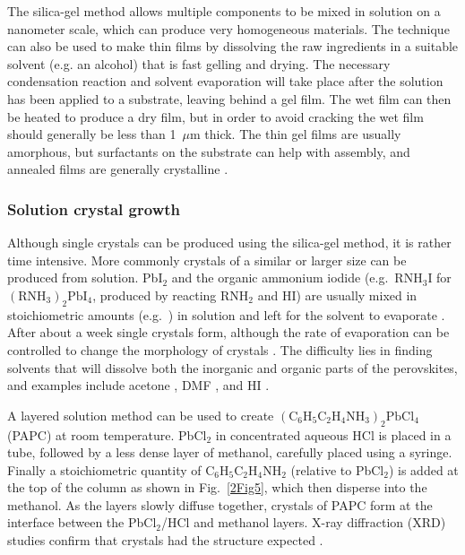 The silica-gel method allows multiple components to be mixed in solution on a nanometer scale, which can produce very homogeneous materials. The technique can also be used to make thin films by dissolving the raw ingredients in a suitable solvent (e.g. an alcohol) that is fast gelling and drying. The necessary condensation reaction and solvent evaporation will take place after the solution has been applied to a substrate, leaving behind a gel film. The wet film can then be heated to produce a dry film, but in order to avoid cracking the wet film should generally be less than 1~$\mu$m thick. The thin gel films are usually amorphous, but surfactants on the substrate can help with assembly, and annealed films are generally crystalline \cite{Mitzi2001b}.

\subsubsection{Solution crystal growth}
Although single crystals can be produced using the silica-gel method, it is rather time intensive. More commonly crystals of a similar or larger size can be produced from solution. Pb$\textrm{I}_2$ and the organic ammonium iodide (e.g.\ R$\textrm{NH}_3$I for $(\textrm{RNH}_3)_2\textrm{PbI}_4$, produced by reacting R$\textrm{NH}_2$ and HI) are usually mixed in stoichiometric amounts (e.g.\ \cite{Kitazawa1996, Tang2001}) in solution and left for the solvent to evaporate \cite{Ishihara1994}. After about a week single crystals form, although the rate of evaporation can be controlled to change the morphology of crystals \cite{Cheng2010}. The difficulty lies in finding solvents that will dissolve both the inorganic and organic parts of the perovskites, and examples include acetone \cite{Hong1992}, DMF \cite{Kitazawa1996}, and HI \cite{Barman2003}.

A layered solution method can be used to create $(\textrm{C}_6\textrm{H}_5\textrm{C}_2\textrm{H}_4\textrm{NH}_3)_2\textrm{PbCl}_4$ (PAPC) at room temperature. Pb$\textrm{Cl}_2$ in concentrated aqueous HCl is placed in a tube, followed by a less dense layer of methanol, carefully placed using a syringe. Finally a stoichiometric quantity of $\textrm{C}_6\textrm{H}_5\textrm{C}_2\textrm{H}_4\textrm{NH}_2$ (relative to Pb$\textrm{Cl}_2$) is added at the top of the column as shown in Fig.\ \ref{2Fig5}, which then disperse into the methanol. As the layers slowly diffuse together, crystals of PAPC form at the interface between the Pb$\textrm{Cl}_2$/HCl and methanol layers. X-ray diffraction (XRD) studies confirm that crystals had the structure expected \cite{Mitzi1999b}.

